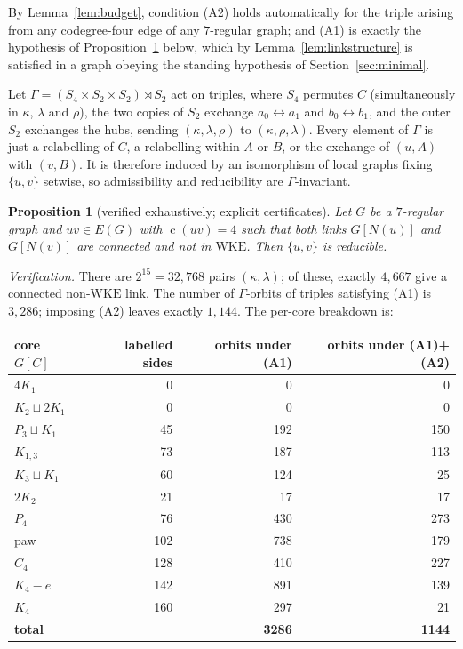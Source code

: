 \documentclass[11pt,a4paper]{amsart}
\theoremstyle{plain}
\newtheorem{proposition}[theorem]{Proposition}
\theoremstyle{definition}
\newcommand{\WKE}{\mathrm{WKE}}
\newcommand{\cod}{\operatorname{c}}
\newcommand{\N}{N}
\begin{document}
By Lemma~\ref{lem:budget}, condition (A2) holds automatically for the triple
arising from any codegree-four edge of any $7$-regular graph; and (A1) is
exactly the hypothesis of Proposition~\ref{prop:codeg4} below, which by
Lemma~\ref{lem:linkstructure} is satisfied in a graph obeying the standing
hypothesis of Section~\ref{sec:minimal}.

Let $\Gamma=(S_4\times S_2\times S_2)\rtimes S_2$ act on triples, where $S_4$
permutes $C$ (simultaneously in $\kappa$, $\lambda$ and $\rho$), the two
copies of $S_2$ exchange $a_0\leftrightarrow a_1$ and
$b_0\leftrightarrow b_1$, and the outer $S_2$ exchanges the hubs, sending
$(\kappa,\lambda,\rho)$ to $(\kappa,\rho,\lambda)$. Every element of $\Gamma$
is just a relabelling of $C$, a relabelling within $A$ or $B$, or the exchange
of $(u,A)$ with $(v,B)$. It is therefore induced by an isomorphism of local
graphs fixing $\{u,v\}$ setwise, so admissibility and reducibility are
$\Gamma$-invariant.

\begin{proposition}[verified exhaustively; explicit certificates]
\label{prop:codeg4}
Let $G$ be a $7$-regular graph and $uv\in E(G)$ with $\cod(uv)=4$ such that
both links $G[\N(u)]$ and $G[\N(v)]$ are connected and not in $\WKE$. Then
$\{u,v\}$ is reducible.
\end{proposition}

\emph{Verification.} There are $2^{15}=32{,}768$ pairs $(\kappa,\lambda)$; of
these, exactly $4{,}667$ give a connected non-$\WKE$ link. The number of
$\Gamma$-orbits of triples satisfying (A1) is $3{,}286$; imposing (A2)
leaves exactly $1{,}144$. The per-core breakdown is:

\begin{center}
\begin{tabular}{lrrr}
\hline
core $G[C]$ & labelled sides & orbits under (A1) & orbits under (A1)+(A2)\\
\hline
$4K_1$        &   0 &   0 &   0\\
$K_2\sqcup 2K_1$ & 0 &   0 &   0\\
$P_3\sqcup K_1$ &  45 & 192 & 150\\
$K_{1,3}$     &  73 & 187 & 113\\
$K_3\sqcup K_1$ &  60 & 124 &  25\\
$2K_2$        &  21 &  17 &  17\\
$P_4$         &  76 & 430 & 273\\
paw           & 102 & 738 & 179\\
$C_4$         & 128 & 410 & 227\\
$K_4-e$       & 142 & 891 & 139\\
$K_4$         & 160 & 297 &  21\\
\hline
\textbf{total} & & \textbf{3286} & \textbf{1144}\\
\hline
\end{tabular}
\end{center}
\end{document}
